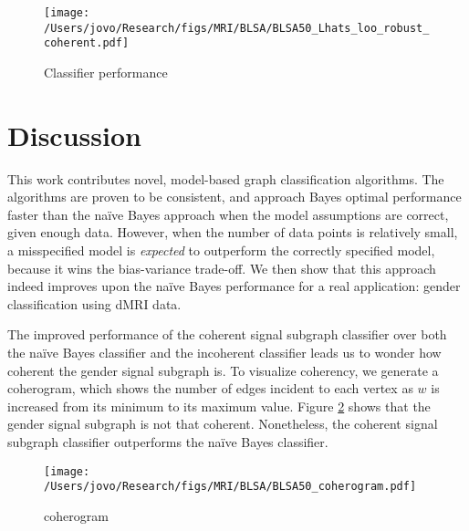 \begin{figure}[h!]
\centering \texttt{[image: /Users/jovo/Research/figs/MRI/BLSA/BLSA50\_Lhats\_loo\_robust\_coherent.pdf]}
\caption{Classifier performance}
\label{fig:Lhats_blsa}
\end{figure}










\section{Discussion} %
\label{sec:discussion}



This work contributes novel, model-based graph classification algorithms.  The algorithms are proven to be consistent, and approach Bayes optimal performance faster than the na\"ive Bayes approach when the model assumptions are correct, given enough data.  However, when the number of data points is relatively small, a misspecified model is \emph{expected} to outperform the correctly specified model, because it wins the bias-variance trade-off.  We then show that this approach indeed improves upon the na\"ive Bayes performance for a real application: gender classification using dMRI data.  

The improved performance of the coherent signal subgraph classifier over both the na\"ive Bayes classifier and the incoherent classifier leads us to wonder how coherent the gender signal subgraph is.  To visualize coherency, we generate a coherogram, which shows the number of edges incident to each vertex as $w$ is increased from its minimum to its maximum value.  Figure \ref{fig:coherogram} shows that the gender signal subgraph is not that coherent.  Nonetheless, the coherent signal subgraph classifier outperforms the na\"ive Bayes classifier.  

\begin{figure}[h!]
\centering \texttt{[image: /Users/jovo/Research/figs/MRI/BLSA/BLSA50\_coherogram.pdf]}
\caption{coherogram}
\label{fig:coherogram}
\end{figure}


